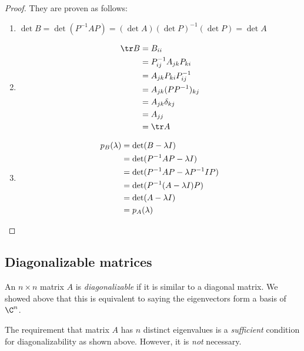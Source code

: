 \documentclass[a4paper]{article}
\begin{document}
\begin{proof}
  They are proven as follows:
  \begin{enumerate}
    \item $\det B =\det (P^{-1}AP) = (\det A) (\det P)^{-1} (\det P) = \det A$
    \item
      \begin{align*}
        \tr B &= B_{ii}\\
        &= P_{ij}^{-1} A_{jk} P_{ki}\\
        &= A_{jk} P_{ki}P_{ij}^{-1}\\
        &= A_{jk}(PP^{-1})_{kj}\\
        &= A_{jk}\delta_{kj}\\
        &= A_{jj}\\
        &= \tr A
      \end{align*}
    \item
      \begin{align*}
        p_B(\lambda) &= \det(B - \lambda I)\\
        &= \det(P^{-1}AP - \lambda I)\\
        &= \det(P^{-1}AP - \lambda P^{-1}IP)\\
        &= \det(P^{-1}(A - \lambda I)P)\\
        &= \det(A - \lambda I)\\
        &= p_A(\lambda)\qedhere
      \end{align*}%
  \end{enumerate}
\end{proof}
\subsection{Diagonalizable matrices}
\begin{defi}
  An $n\times n$ matrix $A$ is \emph{diagonalizable} if it is similar to a diagonal matrix. We showed above that this is equivalent to saying the eigenvectors form a basis of $\C^n$.
\end{defi}

The requirement that matrix $A$ has $n$ distinct eigenvalues is a \emph{sufficient} condition for diagonalizability as shown above. However, it is \emph{not} necessary.
\end{document}

